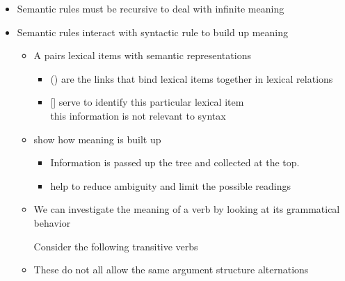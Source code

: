 \documentclass[headrule,footrule]{foils}
\begin{document}
\begin{itemize}
\item Semantic rules must be recursive to deal with infinite meaning
\item Semantic rules interact with syntactic rule to build up meaning 
  \begin{itemize}
  \item A  pairs lexical items with semantic representations
 \begin{itemize}
 \item () are the links that bind lexical items
   together in lexical relations
 \item {[]} serve to identify this particular lexical item
   \\ this information is not relevant to syntax
 \end{itemize}
\item{} show how meaning is built up
  \begin{itemize}
  \item Information is passed up the tree and collected at the top.
  \item {} help to reduce ambiguity and
    limit the possible readings
  \end{itemize}
\end{itemize}

  

\begin{itemize}
\item We can investigate the meaning of a verb by looking at its
  grammatical behavior
  \begin{exe}
    \ex Consider the following transitive verbs
    \begin{xlist}
      \ex {}
      \ex {}
      \ex {}
      \ex {}
    \end{xlist}
  \end{exe}
\item These do not all allow the same argument structure alternations

\end{itemize}


\end{itemize}
\end{document}
